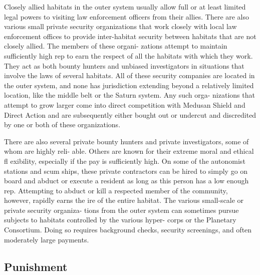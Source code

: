 Closely allied habitats in the outer system usually 
allow full or at least limited legal powers to visiting 
law enforcement officers from their allies. There are 
also various small private security organizations that 
work closely with local law enforcement offices  to 
provide inter-habitat security between habitats that 
are not closely allied. The members of these organi-
zations attempt to maintain sufficiently high rep to 
earn the respect of all the habitats with which they 
work. They act as both bounty hunters and unbiased 
investigators in situations that involve the laws of 
several habitats. All of these security companies are 
located in the outer system, and none has jurisdiction 
extending beyond a relatively limited location, like 
the middle belt or the Saturn system. Any such orga-
nizations that attempt to grow larger come into direct 
competition with Medusan Shield and Direct Action 
and are subsequently either bought out or undercut 
and discredited by one or both of these organizations.

There are also several private bounty hunters and 
private investigators, some of whom are highly reli-
able. Others are known for their extreme moral and 
ethical fl exibility, especially if the pay is sufficiently 
high. On some of the autonomist stations and scum 
ships, these private contractors can be hired to simply 
go on board and abduct or execute a resident as long 
as this person has a low enough rep. Attempting to 
abduct or kill a respected member of the community, 
however, rapidly earns the ire of the entire habitat. 
The various small-scale or private security organiza-
tions from the outer system can sometimes pursue 
subjects to habitats controlled by the various hyper-
corps or the Planetary Consortium. Doing so requires 
background checks, security screenings, and often 
moderately large payments.

\subsection{Punishment}

